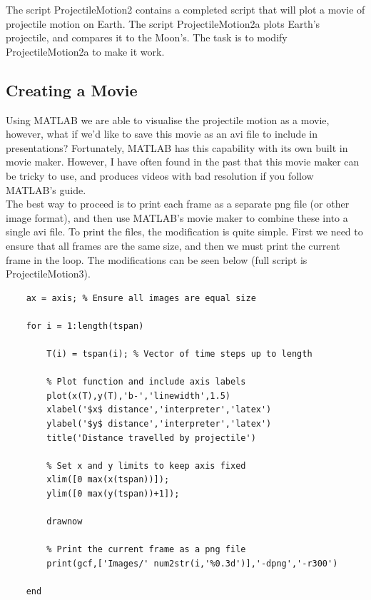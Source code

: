 \documentclass[12pt]{report}
\begin{document}
\begin{tcolorbox}[title=Task (Moderate)]
The script ProjectileMotion2 contains a completed script that will plot a movie of projectile motion on Earth. The script ProjectileMotion2a plots Earth's projectile, and compares it to the Moon's. The task is to modify ProjectileMotion2a to make it work.
\end{tcolorbox}

\subsection*{Creating a Movie}
Using MATLAB we are able to visualise the projectile motion as a movie, however, what if we'd like to save this movie as an avi file to include in presentations? Fortunately, MATLAB has this capability with its own built in movie maker. However, I have often found in the past that this movie maker can be tricky to use, and produces videos with bad resolution if you follow MATLAB's guide.\\

\noindent The best way to proceed is to print each frame as a separate png file (or other image format), and then use MATLAB's movie maker to combine these into a single avi file. To print the files, the modification is quite simple. First we need to ensure that all frames are the same size, and then we must print the current frame in the loop. The modifications can be seen below (full script is ProjectileMotion3).

\begin{lstlisting}
    ax = axis; % Ensure all images are equal size
    
    for i = 1:length(tspan)
    
        T(i) = tspan(i); % Vector of time steps up to length
        
        % Plot function and include axis labels
        plot(x(T),y(T),'b-','linewidth',1.5)
        xlabel('$x$ distance','interpreter','latex')
        ylabel('$y$ distance','interpreter','latex')
        title('Distance travelled by projectile')
        
        % Set x and y limits to keep axis fixed
        xlim([0 max(x(tspan))]);
        ylim([0 max(y(tspan))+1]);
        
        drawnow
        
        % Print the current frame as a png file
        print(gcf,['Images/' num2str(i,'%0.3d')],'-dpng','-r300') 
        
    end
\end{lstlisting}
\end{document}

